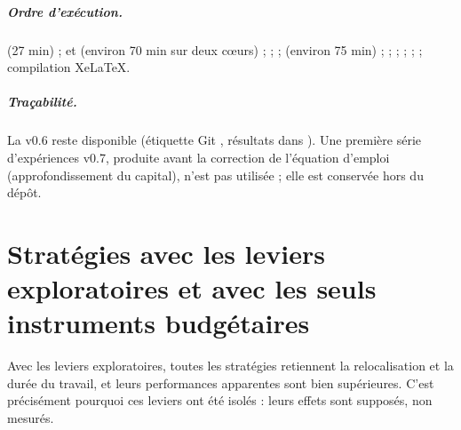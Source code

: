 \paragraph{Ordre d'exécution.}  (27 min) ;  et
 (environ 70 min sur deux cœurs) ;  ;  ;
 (environ 75 min) ;  ;  ;
 ;  ;  ; compilation XeLaTeX.

\paragraph{Traçabilité.} La v0.6 reste disponible (étiquette Git , résultats dans ).
Une première série d'expériences v0.7, produite avant la correction de l'équation d'emploi (approfondissement du
capital), n'est pas utilisée ; elle est conservée hors du dépôt.

\chapter{Stratégies avec les leviers exploratoires et avec les seuls instruments budgétaires}

\begin{table}[htbp]\centering\scriptsize
\caption{Périmètre avec leviers exploratoires (niveau C) : composition et prévision du métamodèle (non vérifiées par le
modèle complet).}
\end{table}

\begin{table}[htbp]\centering\scriptsize
\caption{Périmètre restreint aux instruments fiscaux et budgétaires (niveau A) : composition et prévision du métamodèle
(non vérifiées par le modèle complet).}
\end{table}

Avec les leviers exploratoires, toutes les stratégies retiennent la relocalisation et la durée du travail, et leurs
performances apparentes sont bien supérieures. C'est précisément pourquoi ces leviers ont été isolés : leurs effets
sont supposés, non mesurés.
